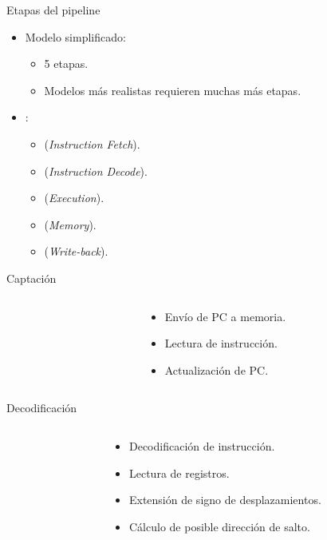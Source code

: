 \begin{frame}[t]{Etapas del pipeline}
\begin{itemize}
  \item Modelo simplificado:
    \begin{itemize}
      \item 5 etapas.
      \item \alert{Modelos más realistas requieren muchas más etapas}.
    \end{itemize}
  \item {}:
    \begin{itemize}
      \item {} (\emph{Instruction Fetch}).
      \item {} (\emph{Instruction Decode}).
      \item {} (\emph{Execution}).
      \item {} (\emph{Memory}).
      \item {} (\emph{Write-back}).
    \end{itemize}
\end{itemize}
\end{frame}

\begin{frame}[t]{Captación}
\begin{columns}
\begin{column}{.5\textwidth}

\end{column}
\begin{column}{.5\textwidth}
\begin{itemize}
  \item Envío de PC a memoria.
  \item Lectura de instrucción.
  \item Actualización de PC.
\end{itemize}
\end{column}
\end{columns}
\end{frame}

\begin{frame}[t]{Decodificación}
\begin{columns}
\begin{column}{.5\textwidth}

\end{column}
\begin{column}{.5\textwidth}
\begin{itemize}
  \item Decodificación de instrucción.
  \item Lectura de registros.
  \item Extensión de signo de desplazamientos.
  \item Cálculo de posible dirección de salto.
\end{itemize}
\end{column}
\end{columns}
\end{frame}

